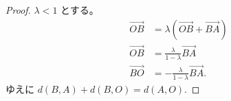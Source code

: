\begin{proof}
  \(\lambda<1\) とする。
  \begin{align*}
    \overrightarrow{OB} &= \lambda(\overrightarrow{OB}+\overrightarrow{BA}) \\
    \overrightarrow{OB} &= \frac{\lambda}{1-\lambda}\overrightarrow{BA} \\
    \overrightarrow{BO} &= -\frac{\lambda}{1-\lambda}\overrightarrow{BA}.
  \end{align*}
  ゆえに \(d(B,A)+d(B,O)=d(A,O).\)
\end{proof}
